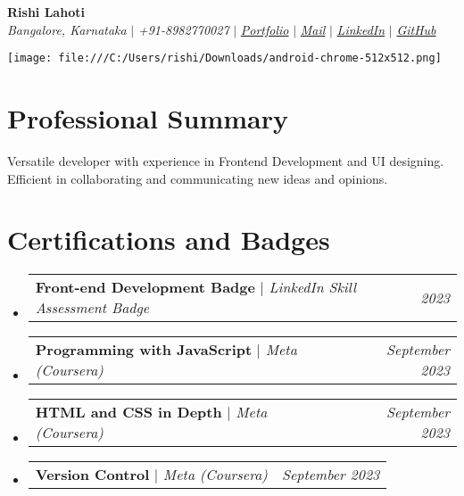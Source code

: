 \documentclass[letterpaper,10pt]{article}
\makeatletter
\newcommand{\sectionspace}{
\vspace{-20pt}
}
\newcommand{\subheadingtitlevspace}{
\vspace{-3pt}
}
\newcommand{\titleItem}[1]{
  \textbf{#1}
}
\newcommand{\resumeProjectHeading}[2]{
    \item
    \begin{tabular*}{0.97\textwidth}{l@{\extracolsep{\fill}}r}
      #1 & \textit{ #2} \\
    \end{tabular*}\vspace{-9pt}
}
\newcommand{\resumeSubHeadingListStart}{\subheadingtitlevspace\begin{itemize}[leftmargin=0.15in, label={}]}
\newcommand{\resumeSubHeadingListEnd}{\end{itemize}}
\makeatother
\begin{document}

\begin{flushleft}
    \begin{minipage}[b]{0.7\linewidth} %
        \textbf{\large Rishi Lahoti} \\    
        \textit{Bangalore, Karnataka} $|$ 
        \textit{+91-8982770027} $|$  
        \href{https://rishilahoti.vercel.app/}{{\textit{Portfolio}}} $|$
        \href{mailto:rishilahoti99@gmail.com}{{\textit{Mail}}} $|$ 
        \href{https://www.linkedin.com/in/rishi-lahoti-665889166/}{{\textit{LinkedIn}}} $|$
        \href{https://github.com/rishilahoti}{{\textit{GitHub}}}
    \end{minipage}
    \hfill
    \begin{minipage}[b]{0.2\linewidth} %
        \texttt{[image: file:///C:/Users/rishi/Downloads/android-chrome-512x512.png]} %
    \end{minipage}
\end{flushleft}


\section{Professional Summary}
\vspace{-3pt}
\begin{itemize}[leftmargin=0.15in, label={}]
    {\item{
     {Versatile developer with experience in Frontend Development and UI designing. Efficient in collaborating and communicating new ideas and opinions.} \\      
    }}
 \end{itemize}
 \sectionspace



\section{Certifications and Badges}
    \resumeSubHeadingListStart
      \resumeProjectHeading
          {\titleItem{Front-end Development Badge} \emph{ $|$ LinkedIn Skill Assessment Badge}}{2023}
      \resumeProjectHeading
          {\titleItem{Programming with JavaScript} \emph{ $|$ Meta (Coursera)}}{September 2023}
      \resumeProjectHeading
          {\titleItem{HTML and CSS in Depth} \emph{$|$ Meta (Coursera)}}{September 2023}
          \resumeProjectHeading
          {\titleItem{Version Control} \emph{$|$ Meta (Coursera)}}{September 2023}
    \resumeSubHeadingListEnd
\end{document}
